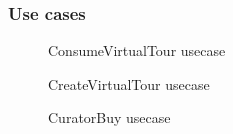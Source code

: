 \documentclass[paper=letter, fontsize=12pt]{article}
\begin{document}
\subsubsection{Use cases}
\begin{figure}[H]
  \begin{center}
    \caption{ConsumeVirtualTour usecase}
    \label{fig:consume_tour}
  \end{center}
\end{figure}
\begin{figure}[H]
  \begin{center}
    \caption{CreateVirtualTour usecase}
    \label{fig:create_tour}
  \end{center}
\end{figure}
\begin{figure}[H]
  \begin{center}
    \caption{CuratorBuy usecase}
    \label{fig:curatorbuy}
  \end{center}
\end{figure}
\end{document}
